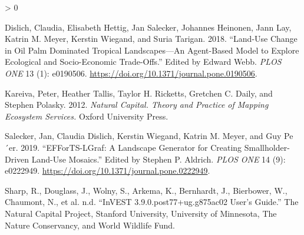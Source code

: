\documentclass[
]{article}
\newlength{\cslhangindent}
\newenvironment{CSLReferences}[2] %
 {%
  \setlength{\parindent}{0pt}
  \ifodd #1 \everypar{\setlength{\hangindent}{\cslhangindent}}\ignorespaces\fi
  \ifnum #2 > 0
  \setlength{\parskip}{#2\baselineskip}
  \fi
 }%
 {}
\begin{document}
\hypertarget{refs}{}
\begin{CSLReferences}{1}{0}
\leavevmode\hypertarget{ref-http:ux2fux2fzotero.orgux2fusersux2f7697927ux2fitemsux2fRJF5NE77}{}%
Dislich, Claudia, Elisabeth Hettig, Jan Salecker, Johannes Heinonen,
Jann Lay, Katrin M. Meyer, Kerstin Wiegand, and Suria Tarigan. 2018.
{``Land-Use Change in Oil Palm Dominated Tropical Landscapes---An
Agent-Based Model to Explore Ecological and Socio-Economic
Trade-Offs.''} Edited by Edward Webb. \emph{PLOS ONE} 13 (1): e0190506.
\url{https://doi.org/10.1371/journal.pone.0190506}.

\leavevmode\hypertarget{ref-http:ux2fux2fzotero.orgux2fusersux2f7697927ux2fitemsux2fRNEYQF22}{}%
Kareiva, Peter, Heather Tallis, Taylor H. Ricketts, Gretchen C. Daily,
and Stephen Polasky. 2012. \emph{Natural Capital. Theory and Practice of
Mapping Ecosystem Services.} Oxford University Press.

\leavevmode\hypertarget{ref-http:ux2fux2fzotero.orgux2fusersux2f7697927ux2fitemsux2fZAPLKXXA}{}%
Salecker, Jan, Claudia Dislich, Kerstin Wiegand, Katrin M. Meyer, and
Guy Pe´er. 2019. {``EFForTS-LGraf: A Landscape Generator for Creating
Smallholder-Driven Land-Use Mosaics.''} Edited by Stephen P. Aldrich.
\emph{PLOS ONE} 14 (9): e0222949.
\url{https://doi.org/10.1371/journal.pone.0222949}.

\leavevmode\hypertarget{ref-http:ux2fux2fzotero.orgux2fusersux2f7697927ux2fitemsux2fUFHIJGJ8}{}%
Sharp, R., Douglass, J., Wolny, S., Arkema, K., Bernhardt, J.,
Bierbower, W., Chaumont, N., et al. n.d. {``InVEST
3.9.0.post77+ug.g875ac02 User's Guide.''} The Natural Capital Project,
Stanford University, University of Minnesota, The Nature Conservancy,
and World Wildlife Fund.

\end{CSLReferences}
\end{document}
